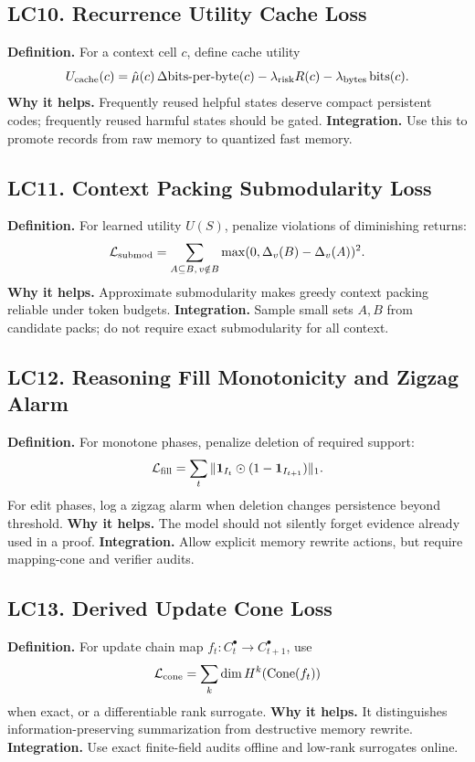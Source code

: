 \documentclass[11pt]{article}
\newcommand{\bitsperbyte}{\mathrm{bits\mbox{-}per\mbox{-}byte}}
\newcommand{\loss}{\mathcal{L}}
\numberwithin{equation}{section}
\begin{document}
\subsection{LC10. Recurrence Utility Cache Loss}
\textbf{Definition.} For a context cell $c$, define cache utility
\begin{equation}
U_{\rm cache}(c)=\hat\mu(c)\,\Delta\bitsperbyte(c)-\lambda_{\rm risk}R(c)-\lambda_{\rm bytes}\operatorname{bits}(c).
\end{equation}
\textbf{Why it helps.} Frequently reused helpful states deserve compact persistent codes; frequently reused harmful states should be gated. \textbf{Integration.} Use this to promote records from raw memory to quantized fast memory.

\subsection{LC11. Context Packing Submodularity Loss}
\textbf{Definition.} For learned utility $U(S)$, penalize violations of diminishing returns:
\begin{equation}
\loss_{\rm submod}=\sum_{A\subseteq B,\,v\notin B}\max(0,\Delta_v(B)-\Delta_v(A))^2.
\end{equation}
\textbf{Why it helps.} Approximate submodularity makes greedy context packing reliable under token budgets. \textbf{Integration.} Sample small sets $A,B$ from candidate packs; do not require exact submodularity for all context.

\subsection{LC12. Reasoning Fill Monotonicity and Zigzag Alarm}
\textbf{Definition.} For monotone phases, penalize deletion of required support:
\begin{equation}
\loss_{\rm fill}=\sum_t \|\mathbf{1}_{I_t}\odot(1-\mathbf{1}_{I_{t+1}})\|_1.
\end{equation}
For edit phases, log a zigzag alarm when deletion changes persistence beyond threshold. \textbf{Why it helps.} The model should not silently forget evidence already used in a proof. \textbf{Integration.} Allow explicit memory rewrite actions, but require mapping-cone and verifier audits.

\subsection{LC13. Derived Update Cone Loss}
\textbf{Definition.} For update chain map $f_t:C_t^\bullet\to C_{t+1}^\bullet$, use
\begin{equation}
\loss_{\rm cone}=\sum_k \dim H^k(\operatorname{Cone}(f_t))
\end{equation}
when exact, or a differentiable rank surrogate. \textbf{Why it helps.} It distinguishes information-preserving summarization from destructive memory rewrite. \textbf{Integration.} Use exact finite-field audits offline and low-rank surrogates online.
\end{document}

